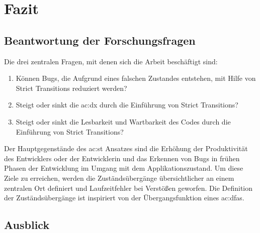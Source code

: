 \chapter{Fazit} \label{ch:fazit}

\section{Beantwortung der Forschungsfragen}
Die drei zentralen Fragen, mit denen sich die Arbeit beschäftigt sind:

\begin{enumerate}
  \item Können Bugs, die Aufgrund eines falschen Zustandes entstehen, mit Hilfe von Strict Transitions reduziert werden?
  \item Steigt oder sinkt die \acrshort{ac:dx} durch die Einführung von Strict Transitions?
  \item Steigt oder sinkt die Lesbarkeit und Wartbarkeit des Codes durch die Einführung von Strict Transitions?
\end{enumerate}

Der Hauptgegenstände des \acrlong{ac:st} Ansatzes sind die Erhöhung der Produktivität des Entwicklers oder der Entwicklerin und das Erkennen von Bugs in frühen Phasen der Entwicklung im Umgang mit dem Applikationszustand. Um diese Ziele zu erreichen, werden die Zuständsübergänge übersichtlicher an einem zentralen Ort definiert und Laufzeitfehler bei Verstößen geworfen. Die Definition der Zuständsübergänge ist inspiriert von der Übergangsfunktion eines \acrshort{ac:dfa}s.

\section{Ausblick}